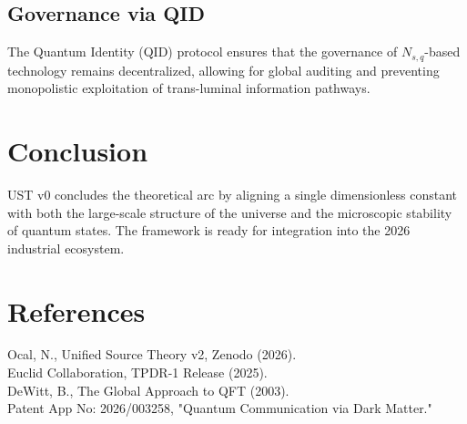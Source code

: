 \documentclass[11pt,a4paper,twocolumn]{article}
\begin{document}
\subsection{Governance via QID}
The Quantum Identity (QID) protocol ensures that the governance of $N_{s,q}$-based technology remains decentralized, allowing for global auditing and preventing monopolistic exploitation of trans-luminal information pathways.

\section{Conclusion}
UST v0 concludes the theoretical arc by aligning a single dimensionless constant with both the large-scale structure of the universe and the microscopic stability of quantum states. The framework is ready for integration into the 2026 industrial ecosystem.

\section*{References}
\small
\noindent [1] Ocal, N., Unified Source Theory v2, Zenodo (2026). \\
\noindent [2] Euclid Collaboration, TPDR-1 Release (2025). \\
\noindent [3] DeWitt, B., The Global Approach to QFT (2003). \\
\noindent [4] Patent App No: 2026/003258, "Quantum Communication via Dark Matter."
\end{document}
